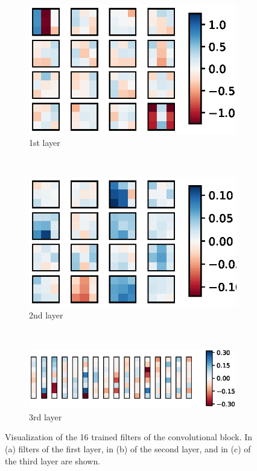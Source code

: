\documentclass{scrartcl}
\begin{document}
\begin{figure}[htbp]
\centering
\begin{subfigure}[b]{0.4\textwidth}
\centering
\includegraphics[scale=0.82]{figures/conv2d_layer_1.eps}
\caption{1st layer}
\label{fig:1st_layer}
\end{subfigure}
~ %
\begin{subfigure}[b]{0.4\textwidth}
\centering
\includegraphics[scale=0.82]{figures/conv2d_layer_2.eps}
\caption{2nd layer}
\label{fig:2nd_layer}
\end{subfigure}
~ %
\begin{subfigure}[b]{0.9\textwidth}
\centering
\includegraphics[scale=0.82]{figures/conv2d_layer_3.eps}
\caption{3rd layer}
\label{fig:3rd_layer}
\end{subfigure}
\caption{Visualization of the 16 trained filters of the convolutional block. In (a) filters of the first layer, in (b) of the second layer, and in (c) of the third layer are shown. }
\label{fig:filter_inspection}
\end{figure}
\end{document}
